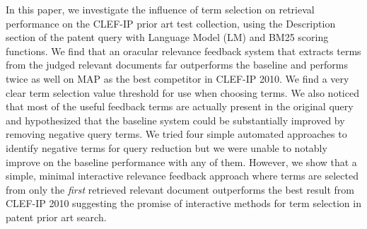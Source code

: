 In this paper, we investigate the influence of term selection on retrieval
performance on the CLEF-IP prior art test collection, using the Description section of the patent query with Language Model (LM) and BM25 scoring functions. We find that an oracular relevance feedback system that extracts terms from the judged relevant documents far
outperforms the baseline and performs twice as well on MAP as the best
competitor in CLEF-IP 2010.  We find a very clear term selection value
threshold for use when choosing terms.  We also noticed that most of
the useful feedback terms are actually present in the original query
and hypothesized that the baseline system could be substantially
improved by removing negative query terms.
We tried four simple automated approaches to identify negative terms
for query reduction but we were unable to notably improve on the baseline
performance with any of them.  However, we show that a
simple, minimal interactive relevance feedback approach where terms are selected
from only the \emph{first} retrieved relevant document outperforms the best
result from CLEF-IP 2010 suggesting the promise of interactive methods
for term selection in patent prior art search.

\begin{comment}
We investigate the influence of term selection on retrieval performance on the CLEF-IP Prior Art test collection, starting with the Description section of the reference patent and using LM and BM25 scoring functions.    We find that an oracular relevance feedback system which extracts terms from the judged relevant documents far outperforms the baseline and  performs twice as well on MAP as the best competitor in CLEF-2014.  We find a very clear term selection value threshold for use when choosing terms.  A much more realistic approach in which feedback terms are extracted only from the first relevant document retrieved, still outperforms last year’s winner.   We noticed that most of the useful feedback terms are actually present in the original query and hypothesized that the baseline system could be substantially improved by removing negative query terms.  We tried three different approaches to identifying negative terms but were unable to improve on the baseline performance with any of them.
\end{comment}

